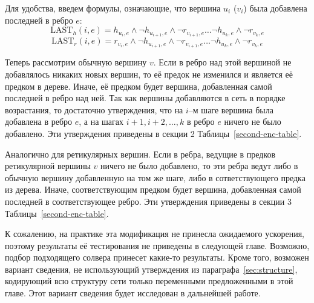 Для удобства, введем формулы, означающие, что вершина $u_i$ ($v_i$) была добавлена последней в ребро $e$:
$$\mathrm{LAST}_h(i, e) = h_{u_i, e} \wedge \neg h_{u_{i+1}, e} \wedge \neg r_{v_{i+1}, e} \dots \neg h_{u_k, e} \wedge \neg r_{v_k, e}$$
$$\mathrm{LAST}_r(i, e) = r_{v_i, e} \wedge \neg h_{u_{i+1}, e} \wedge \neg r_{v_{i+1}, e} \dots \neg h_{u_k, e} \wedge \neg r_{v_k, e}$$

Теперь рассмотрим обычную вершину $v$.
Если в ребро над этой вершиной не добавлялось никаких новых вершин, то её предок не изменился и является её предком в дереве.
Иначе, её предком будет вершина, добавленная самой последней в ребро над ней.
Так как вершины добавляются в сеть в порядке возрастания, то достаточно утверждения, что на $i$--м шаге вершина была добавлена в ребро $e$, а на шагах $i+1, i+2, \dots , k$ в ребро $e$ ничего не было добавлено.
Эти утверждения приведены в секции 2 Таблицы~\ref{second-enc-table}.

Аналогично для ретикулярных вершин.
Если в ребра, ведущие в предков ретикулярной вершины $v$ ничего не было добавлено, то эти ребра ведут либо в обычную вершину добавленную на том же шаге, либо в сответствующего предка из дерева.
Иначе, соответствующим предком будет вершина, добавленная самой последней в соответствующее ребро.
Эти утверждения приведены в секции 3 Таблицы~\ref{second-enc-table}.

К сожалению, на практике эта модификация не принесла ожидаемого ускорения, поэтому результаты её тестирования не приведены в следующей главе.
Возможно, подбор подходящего солвера принесет какие-то результаты.
Кроме того, возможен вариант сведения, не использующий утверждения из параграфа~\ref{sec:structure}, кодирующий всю структуру сети только переменными предложенными в этой главе.
Этот вариант сведения будет исследован в дальнейшей работе.

